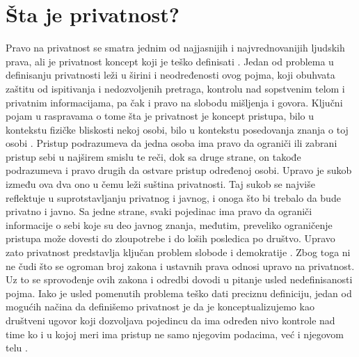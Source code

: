\documentclass[a4paper]{article}
\begin{document}
\section{Šta je privatnost?}
\label{sec:prvoPoglavlje}
Pravo na privatnost se smatra jednim od najjasnijih i najvrednovanijih ljudskih prava, ali je privatnost koncept koji je teško definisati \cite{solove}. Jedan od problema u definisanju privatnosti leži u širini i neodređenosti ovog pojma, koji obuhvata zaštitu od ispitivanja i nedozvoljenih pretraga, kontrolu nad sopstvenim telom i privatnim informacijama, pa čak i pravo na slobodu mišljenja i govora. Ključni pojam u raspravama o tome šta je privatnost je koncept pristupa, bilo u kontekstu fizičke bliskosti nekoj osobi, bilo u kontekstu posedovanja znanja o toj osobi \cite{ethics}. Pristup podrazumeva da jedna osoba ima pravo da ograniči ili zabrani pristup sebi u najširem smislu te reči, dok sa druge strane, on takođe podrazumeva i pravo drugih da ostvare pristup određenoj osobi. Upravo je sukob između ova dva ono u čemu leži suština privatnosti. Taj sukob se najviše reflektuje u suprotstavljanju  privatnog i javnog, i onoga što bi trebalo da bude privatno i javno. Sa jedne strane, svaki pojedinac ima pravo da ograniči informacije o sebi koje su deo javnog znanja, međutim, preveliko ograničenje pristupa može dovesti do zloupotrebe i do loših posledica po društvo. Upravo zato privatnost predstavlja ključan problem slobode i demokratije \cite{solove}. Zbog toga ni ne čudi što se ogroman broj zakona i ustavnih prava odnosi upravo na privatnost. Uz to se sprovođenje ovih zakona i odredbi dovodi u pitanje usled nedefinisanosti pojma. Iako je usled pomenutih problema teško dati preciznu definiciju, jedan od mogućih načina da definišemo privatnost je da je konceptualizujemo kao društveni ugovor koji dozvoljava pojedincu da ima određen nivo kontrole nad time ko i u kojoj meri ima pristup ne samo njegovim podacima, već i njegovom telu \cite{ethics}.
\end{document}

